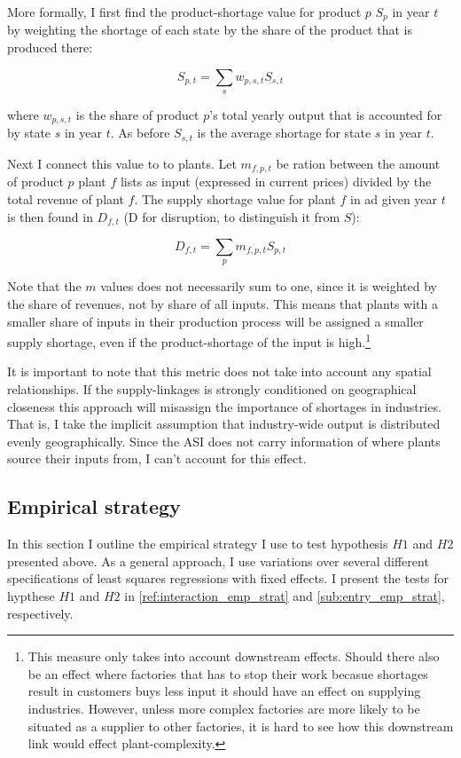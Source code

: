 \documentclass[11pt]{article}
\begin{document}
More formally, I first find the product-shortage value for product $p$ $S_{p}$ in year $t$ by weighting the shortage of each state by the share of the product that is produced there:

\[
	S_{p,t} =  \sum_s w_{p,s,t} S_{s,t} 
\]

where $w_{p,s,t}$ is the share of product $p$'s total yearly output that is accounted for by state $s$ in year $t$. As before $S_{s,t}$ is the average shortage for state $s$ in year $t$. 

Next I connect this value to to plants. Let $m_{f,p,t}$ be ration between the amount of product $p$ plant $f$ lists as input (expressed in current prices) divided by the total revenue of plant $f$. The supply shortage value for plant $f$ in ad given year $t$ is then found in $D_{f,t}$ (D for disruption, to distinguish it from $S$): 

\[
	D_{f,t} = \sum_p m_{f,p,t} S_{p,t}
\]

Note that the $m$ values does not necessarily sum to one, since it is weighted by the share of revenues, not by share of all inputs. This means that plants with a smaller share of inputs in their production process will be assigned a smaller supply shortage, even if the product-shortage of the input is high.\footnote{This measure only takes into account downstream effects. Should there also be an effect where factories that has to stop their work becasue shortages result in customers buys less input it should have an effect on supplying industries. However, unless more complex factories are more likely to be situated as a supplier to other factories, it is hard to see how this downstream link would effect plant-complexity.}

It is important to note that this metric does not take into account any spatial relationships. If the supply-linkages is strongly conditioned on geographical closeness this approach will misassign the importance of shortages in industries. That is, I take the implicit assumption that industry-wide output is distributed evenly geographically. Since the ASI does not carry information of where plants source their inputs from, I can't account for this effect.

\subsection{Empirical strategy}\label{sec:emp_strat}

In this section I outline the empirical strategy I use to test hypothesis $H1$ and $H2$ presented above. As a general approach, I use variations over several different specifications of least squares regressions with fixed effects. I present the tests for hypthese $H1$ and $H2$ in \ref{ref:interaction_emp_strat} and \ref{sub:entry_emp_strat}, respectively.
\end{document}
